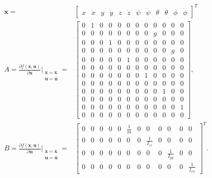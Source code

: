 \begin{align}
\begin{split}
\mathbf{x} = & \begin{bmatrix}
x & \dot{x} & y & \dot{y} & z & \dot{z} & \psi & \dot{\psi} & \theta & \dot{\theta} & \phi & \dot{\phi}
\end{bmatrix}^{T}\\
A  = \frac{\partial f(\mathbf{x},\mathbf{u})}{\partial \mathbf{x}}\Bigr|_{\substack{\mathbf{x}=\overline{\mathbf{x}}\\\mathbf{u}=\overline{\mathbf{u}}}} = & 
\begin{bmatrix}
0 & 1 & 0 & 0 & 0 & 0 & 0 & 0 & 0 & 0 & 0 & 0\\[2px]
0 & 0 & 0 & 0 & 0 & 0 & 0 & 0 & g & 0 & 0 & 0\\[2px]
0 & 0 & 0 & 1 & 0 & 0 & 0 & 0 & 0 & 0 & 0 & 0\\[2px]
0 & 0 & 0 & 0 & 0 & 0 & 0 & 0 & 0 & 0 & g & 0\\[2px]
0 & 0 & 0 & 0 & 0 & 1 & 0 & 0 & 0 & 0 & 0 & 0\\[2px]
0 & 0 & 0 & 0 & 0 & 0 & 0 & 0 & 0 & 0 & 0 & 0\\[2px]
0 & 0 & 0 & 0 & 0 & 0 & 0 & 1 & 0 & 0 & 0 & 0\\[2px]
0 & 0 & 0 & 0 & 0 & 0 & 0 & 0 & 0 & 0 & 0 & 0\\[2px]
0 & 0 & 0 & 0 & 0 & 0 & 0 & 0 & 0 & 1 & 0 & 0\\[2px]
0 & 0 & 0 & 0 & 0 & 0 & 0 & 0 & 0 & 0 & 0 & 0\\[2px]
0 & 0 & 0 & 0 & 0 & 0 & 0 & 0 & 0 & 0 & 0 & 1\\[2px]
0 & 0 & 0 & 0 & 0 & 0 & 0 & 0 & 0 & 0 & 0 & 0
\end{bmatrix}, \\[15px]
B = \frac{\partial f(\mathbf{x},\mathbf{u})}{\partial \mathbf{u}}\Bigr|_{\substack{\mathbf{x}=\overline{\mathbf{x}}\\\mathbf{u}=\overline{\mathbf{u}}}} = & 
\begin{bmatrix}
0 & 0 & 0 & 0 & 0 & \frac{1}{m} & 0 & 0 & 0 & 0 & 0 & 0\\[5px]
0 & 0 & 0 & 0 & 0 & 0 & 0 & \frac{1}{I_{zz}} & 0 & 0 & 0 & 0\\[5px]
0 & 0 & 0 & 0 & 0 & 0 & 0 & 0 & 0 & \frac{1}{I_{yy}} & 0 & 0\\[5px]
0 & 0 & 0 & 0 & 0 & 0 & 0 & 0 & 0 & 0 & 0 & \frac{1}{I_{xx}}
\end{bmatrix}^{T}.
\end{split}
\end{align}

